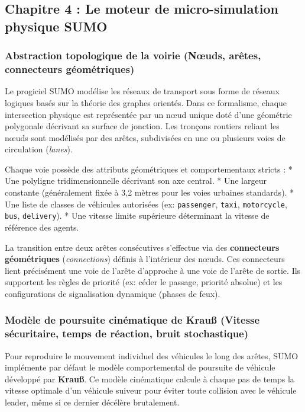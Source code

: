 \documentclass[10pt, a4paper]{article}
\begin{document}
\subsection{Chapitre 4 : Le moteur de micro-simulation physique
SUMO}\label{chapitre-4-le-moteur-de-micro-simulation-physique-sumo}

\subsubsection{Abstraction topologique de la voirie (Nœuds, arêtes,
connecteurs
géométriques)}\label{abstraction-topologique-de-la-voirie-nux153uds-aruxeates-connecteurs-guxe9omuxe9triques}

Le progiciel SUMO modélise les réseaux de transport sous forme de
réseaux logiques basés sur la théorie des graphes orientés. Dans ce
formalisme, chaque intersection physique est représentée par un nœud
unique doté d'une géométrie polygonale décrivant sa surface de jonction.
Les tronçons routiers reliant les nœuds sont modélisés par des arêtes,
subdivisées en une ou plusieurs voies de circulation (\emph{lanes}).

Chaque voie possède des attributs géométriques et comportementaux
stricts : * Une polyligne tridimensionnelle décrivant son axe central. *
Une largeur constante (généralement fixée à 3,2 mètres pour les voies
urbaines standards). * Une liste de classes de véhicules autorisées (ex:
\texttt{passenger}, \texttt{taxi}, \texttt{motorcycle}, \texttt{bus},
\texttt{delivery}). * Une vitesse limite supérieure déterminant la
vitesse de référence des agents.

La transition entre deux arêtes consécutives s'effectue via des
\textbf{connecteurs géométriques} (\emph{connections}) définis à
l'intérieur des nœuds. Ces connecteurs lient précisément une voie de
l'arête d'approche à une voie de l'arête de sortie. Ils supportent les
règles de priorité (ex: céder le passage, priorité absolue) et les
configurations de signalisation dynamique (phases de feux).

\subsubsection{Modèle de poursuite cinématique de Krauß (Vitesse
sécuritaire, temps de réaction, bruit
stochastique)}\label{moduxe8le-de-poursuite-cinuxe9matique-de-krauuxdf-vitesse-suxe9curitaire-temps-de-ruxe9action-bruit-stochastique}

Pour reproduire le mouvement individuel des véhicules le long des
arêtes, SUMO implémente par défaut le modèle comportemental de poursuite
de véhicule développé par \textbf{Krauß}. Ce modèle cinématique calcule
à chaque pas de temps la vitesse optimale d'un véhicule suiveur pour
éviter toute collision avec le véhicule leader, même si ce dernier
décélère brutalement.
\end{document}
